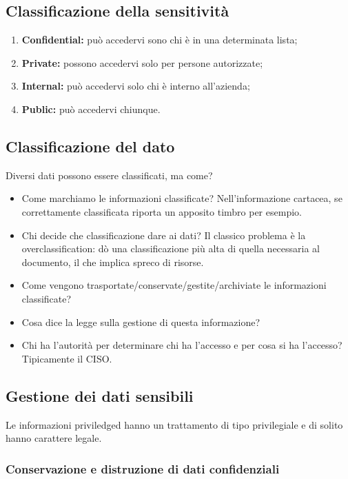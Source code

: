 \subsection{Classificazione della sensitività}

\begin{enumerate}
\item \textbf{Confidential:} può accedervi sono chi è in una determinata lista;
\item \textbf{Private:} possono accedervi solo per persone autorizzate;
\item \textbf{Internal:} può accedervi solo chi è interno all'azienda;
\item \textbf{Public:} può accedervi chiunque.
\end{enumerate}


\subsection{Classificazione del dato}

Diversi dati possono essere classificati, ma come?

\begin{itemize}
\item Come marchiamo le informazioni classificate? Nell'informazione cartacea,
se correttamente classificata riporta un apposito timbro per esempio.
\item Chi decide che classificazione dare ai dati? Il classico problema è la
overclassification: dò una classificazione più alta di quella necessaria al
documento, il che implica spreco di risorse.
\item Come vengono trasportate/conservate/gestite/archiviate le informazioni
classificate?
\item Cosa dice la legge sulla gestione di questa informazione?
\item Chi ha l'autorità per determinare chi ha l'accesso e per cosa si ha
l'accesso? Tipicamente il CISO.
\end{itemize}

\subsection{Gestione dei dati sensibili}

Le informazioni priviledged hanno un trattamento di tipo privilegiale e di
solito hanno carattere legale.

\subsubsection{Conservazione e distruzione di dati confidenziali}

